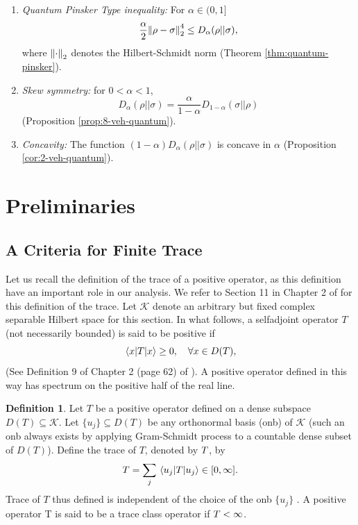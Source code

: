 \documentclass[12pt,a4paper,oneside]{article}
\numberwithin{equation}{section}
\theoremstyle{definition}  %
\newtheorem{defn}{Definition}[section]
\theoremstyle{plain}  %
\theoremstyle{remark} %
\newcommand{\CK}{\mathcal{K}}
\let\tr\relax
\DeclareMathOperator{\tr}{Tr}
\begin{document}
\begin{enumerate}
    \item \textit{Quantum Pinsker Type inequality:} For $\alpha\in (0,1]$ \begin{align*}
  \frac{\alpha}{2}\norm{\rho-\sigma}_2^4\leq   D_{\alpha}(\rho||\sigma),
 \end{align*}
 where $\norm{\cdot}_2$ denotes the Hilbert-Schmidt norm (Theorem \ref{thm:quantum-pinsker}).
    
    \item \textit{Skew symmetry:} for $0<\alpha<1$, \[D_\alpha(\rho||\sigma) = \frac{\alpha}{1-\alpha}D_{1-\alpha}(\sigma||\rho)\]
    (Proposition \ref{prop:8-veh-quantum}).
    
    \item \textit{Concavity:} The function $(1-\alpha)D_{\alpha}(\rho||\sigma)$ is concave in $\alpha$ (Proposition \ref{cor:2-veh-quantum}).
    \end{enumerate}
 
 \section{Preliminaries}\label{sec:preliminaries}


\subsection{A Criteria for Finite Trace}Let us recall the definition of the trace of a positive operator, as this definition have an important role in our analysis. We refer to Section 11 in Chapter 2 of \cite{vN2018} for this definition of the trace. Let $\CK$ denote an arbitrary but fixed complex separable Hilbert space for this section. In what follows, a selfadjoint operator $T$ (not necessarily bounded) is said to be positive  if \begin{equation}
    \mel{x}{T}{x}\geq 0,\quad \forall x\in D(T),
\end{equation}  (See Definition 9 of  Chapter 2 (page 62) of \cite{vN2018}). A positive operator defined in this way has spectrum on the positive half of the real line. 
\begin{defn}\label{defn:trace} 
 Let $T$ be a positive operator defined on a dense subspace $D(T)\subseteq \CK$. Let $\{u_j\} \subseteq D(T)$ be any orthonormal basis (onb) of $\CK$ (such an onb always exists by applying Gram-Schmidt process to a countable dense subset of $D(T)$). Define the trace of $T$, denoted by $\tr T$, by \begin{align}
     \tr T = \sum\limits_j \mel{u_j}{T}{u_j} \in [0, \infty].
 \end{align} 
 Trace of $T$ thus defined is independent of the choice of the onb $\{u_j\}$ \cite{vN2018}. A positive operator T is said to be a trace class operator if $\tr T <\infty$.
\end{defn}
\end{document}
